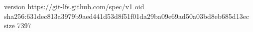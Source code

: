 version https://git-lfs.github.com/spec/v1
oid sha256:631dec813a3979b9aed441d53d8f51f01da29ba09e69ad50a03bd8eb685d13ec
size 7397
